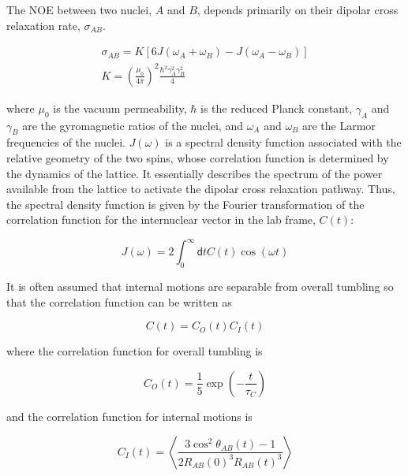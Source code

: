 \documentclass[9pt,review,pubversion]{livecoms}
\begin{document}
The NOE between two nuclei, $A$ and $B$, depends primarily on their dipolar cross relaxation rate, $\sigma_{AB}$.

\begin{equation}
\label{eqn:noe_cross_relaxation}
\begin{gathered}
\sigma_{AB} = K \left[ 6 J(\omega_A + \omega_B) - J(\omega_A - \omega_B) \right] \\
K = \left( \frac {\mu_0} {4 \pi} \right)^2 \frac {\hbar^2 \gamma_A^2 \gamma_B^2} {4}
\end{gathered}
\end{equation}

\noindent where $\mu_0$ is the vacuum permeability, $\hbar$ is the reduced Planck constant, $\gamma_A$ and $\gamma_B$ are the gyromagnetic ratios of the nuclei, and $\omega_A$ and $\omega_B$ are the Larmor frequencies of the nuclei.
$J(\omega)$ is a spectral density function associated with the relative geometry of the two spins, whose correlation function is determined by the dynamics of the lattice. It essentially describes the spectrum of the power available from the lattice to activate the dipolar cross relaxation pathway.
Thus, the spectral density function is given by the Fourier transformation of the correlation function for the internuclear vector in the lab frame, $C(t)$:

\begin{equation}
\label{eqn:noe_spectral_density}
J(\omega) = 2 \int_0^\infty \mathsf{d}t C(t) \cos (\omega t)
\end{equation}

\noindent It is often assumed \cite {lipari_model-free_1982} that internal motions are separable from overall tumbling so that the correlation function can be written as

\begin{equation}
\label{eqn:noe_correlation}
C(t) = C_O(t) C_I(t)
\end{equation}

\noindent where the correlation function for overall tumbling is

\begin{equation}
\label{eqn:noe_overall_correlation}
C_O(t) = \frac {1} {5} \exp \left( -\frac {t} {\tau_C} \right)
\end{equation}

\noindent and the correlation function for internal motions is

\begin{equation}
\label{eqn:noe_internal_correlation}
C_I(t) = \left \langle \frac {3 \cos^2 \theta_{AB}(t) - 1} {2 R_{AB}(0)^3 R_{AB}(t)^3} \right \rangle
\end{equation}
\end{document}
